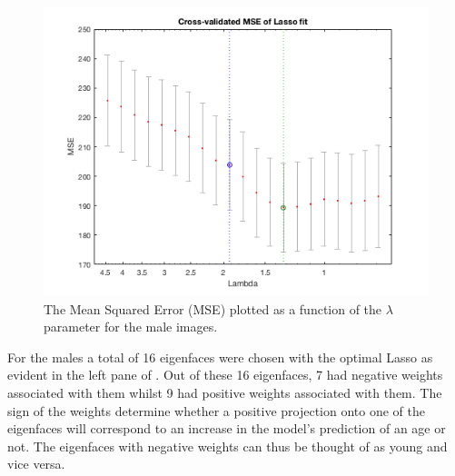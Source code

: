 \begin{figure}[ht!]
    \centering
    \includegraphics[width=0.8\linewidth]{fig/MSE_M_40.png}
    \caption{The Mean Squared Error (MSE) plotted as a function of the $\lambda$ parameter for the male images.}
    \label{fig:M_MSE}
\end{figure}

For the males a total of 16 eigenfaces were chosen with the optimal Lasso as evident in the left pane of . Out of these 16 eigenfaces, 7 had negative weights associated with them whilst 9 had positive weights associated with them. The sign of the weights determine whether a positive projection onto one of the eigenfaces will correspond to an increase in the model's prediction of an age or not. The eigenfaces with negative weights can thus be thought of as young and vice versa.

